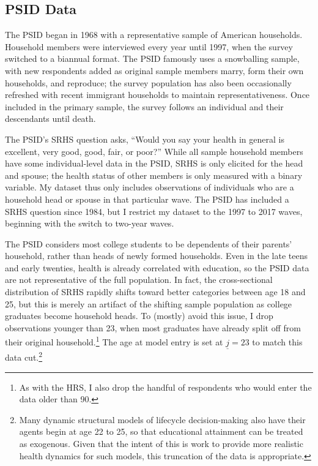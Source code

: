 \documentclass[12pt,pdftex,letterpaper]{article}
\newcommand{\Age}{j}
\newcommand{\AgeMin}{\underline{\Age}}
\begin{document}
\subsection{PSID Data}\label{sec:PSID}

The PSID began in 1968 with a representative sample of American households.  Household members were interviewed every year until 1997, when the survey switched to a biannual format. The PSID famously uses a snowballing sample, with new respondents added as original sample members marry, form their own households, and reproduce; the survey population has also been occasionally refreshed with recent immigrant households to maintain representativeness.  Once included in the primary sample, the survey follows an individual and their descendants until death.

The PSID's SRHS question asks, ``Would you say your health in general is excellent, very good, good, fair, or poor?''  While all sample household members have some individual-level data in the PSID, SRHS is only elicited for the head and spouse; the health status of other members is only measured with a binary variable.  My dataset thus only includes observations of individuals who are a household head or spouse in that particular wave. The PSID has included a SRHS question since 1984, but I restrict my dataset to the 1997 to 2017 waves, beginning with the switch to two-year waves.

The PSID considers most college students to be dependents of their parents' household, rather than heads of newly formed households.  Even in the late teens and early twenties, health is already correlated with education, so the PSID data are not representative of the full population.  In fact, the cross-sectional distribution of SRHS rapidly shifts toward better categories between age 18 and 25, but this is merely an artifact of the shifting sample population as college graduates become household heads. To (mostly) avoid this issue, I drop observations younger than 23, when most graduates have already split off from their original household.\footnote{As with the HRS, I also drop the handful of respondents who would enter the data older than 90.} The age at model entry is set at $\AgeMin=23$ to match this data cut.\footnote{Many dynamic structural models of lifecycle decision-making also have their agents begin at age 22 to 25, so that educational attainment can be treated as exogenous. Given that the intent of this is work to provide more realistic health dynamics for such models, this truncation of the data is appropriate.}
\end{document}

